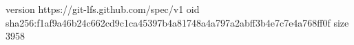 version https://git-lfs.github.com/spec/v1
oid sha256:f1af9a46b24c662cd9c1ca45397b4a81748a4a797a2abff3b4e7c7e4a768ff0f
size 3958
